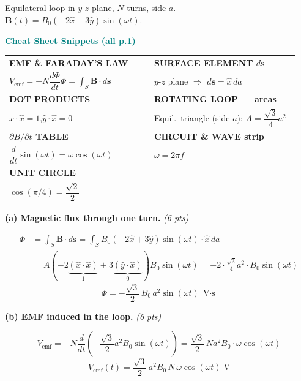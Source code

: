 \documentclass[11pt,letterpaper]{article}
\begin{document}
\vspace{4pt}
Equilateral loop in $y$-$z$ plane, $N$ turns, side $a$.\quad
$\mathbf{B}(t)=B_0(-2\hat{x}+3\hat{y})\sin(\omega t)$.

\begin{cssnip}
\textbf{\small\textcolor{teal}{Cheat Sheet Snippets (all p.1)}}\\[3pt]
\begin{tabular}{@{}p{0.47\linewidth}p{0.47\linewidth}@{}}
\textbf{EMF \& FARADAY'S LAW} & \textbf{SURFACE ELEMENT $d\mathbf{s}$}\\
$V_\text{emf}=-N\dfrac{d\Phi}{dt}$\quad $\Phi=\displaystyle\int_S\mathbf{B}\cdot d\mathbf{s}$ &
$y$-$z$ plane $\Rightarrow$ $d\mathbf{s}=\hat{x}\,da$\\[6pt]
\textbf{DOT PRODUCTS} & \textbf{ROTATING LOOP --- areas}\\
$\hat{x}\cdot\hat{x}=1$,\quad $\hat{y}\cdot\hat{x}=0$ &
Equil.\ triangle (side $a$): $A=\dfrac{\sqrt{3}}{4}a^2$\\[6pt]
\textbf{$\partial B/\partial t$ TABLE} & \textbf{CIRCUIT \& WAVE strip}\\
$\dfrac{d}{dt}\sin(\omega t)=\omega\cos(\omega t)$ & $\omega=2\pi f$\\[6pt]
\textbf{UNIT CIRCLE} & \\
$\cos(\pi/4)=\dfrac{\sqrt{2}}{2}$ & \\
\end{tabular}
\end{cssnip}

\textbf{(a) Magnetic flux through one turn.} \hfill\textit{(6 pts)}

\begin{align*}
\Phi &= \int_S \mathbf{B}\cdot d\mathbf{s}
= \int_S B_0(-2\hat{x}+3\hat{y})\sin(\omega t)\cdot\hat{x}\,da\\
&= A\!\left(-2\underbrace{(\hat{x}\cdot\hat{x})}_{1}+3\underbrace{(\hat{y}\cdot\hat{x})}_{0}\right)B_0\sin(\omega t)
= -2\cdot\frac{\sqrt{3}}{4}a^2\cdot B_0\sin(\omega t)
\end{align*}
\[
\boxed{\Phi = -\frac{\sqrt{3}}{2}\,B_0\,a^2\sin(\omega t)\;\text{V$\cdot$s}}
\]

\textbf{(b) EMF induced in the loop.} \hfill\textit{(6 pts)}

\[
V_\text{emf} = -N\frac{d}{dt}\!\left(-\frac{\sqrt{3}}{2}a^2 B_0\sin(\omega t)\right)
= \frac{\sqrt{3}}{2}\,N a^2 B_0\cdot\omega\cos(\omega t)
\]
\[
\boxed{V_\text{emf}(t) = \frac{\sqrt{3}}{2}\,a^2 B_0\, N\,\omega\cos(\omega t)\;\text{V}}
\]
\end{document}
